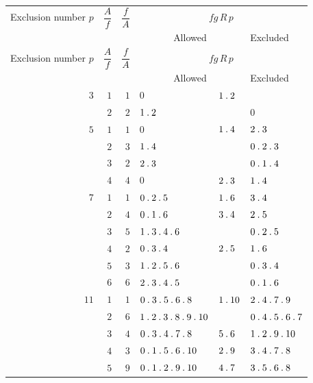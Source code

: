 \clearpage
\begingroup\fontsize{8.3}{9.2}\selectfont\setlength{\tabcolsep}{2pt}\renewcommand{\arraystretch}{1.00}
\begin{longtable}{r|r|r|p{113pt}|p{29pt}|p{120pt}}
\hline
\shortstack{Exclusion\\number\\$p$} & $\dfrac{A}{f}$ & $\dfrac{f}{A}$ & \multicolumn{3}{c}{$fg\,R\,p$}\\\cline{4-6}
& & & \multicolumn{2}{c|}{Allowed} & Excluded\\\hline
\endfirsthead
\shortstack{Exclusion\\number\\$p$} & $\dfrac{A}{f}$ & $\dfrac{f}{A}$ & \multicolumn{3}{c}{$fg\,R\,p$}\\\cline{4-6}
& & & \multicolumn{2}{c|}{Allowed} & Excluded\\\hline
\endhead
$3$ & $1$ & $1$ & $0$ & $1\mathbin{.} 2$ & \\
 & $2$ & $2$ & $1\mathbin{.} 2$ &  & $0$\\
$5$ & $1$ & $1$ & $0$ & $1\mathbin{.} 4$ & $2\mathbin{.} 3$\\
 & $2$ & $3$ & $1\mathbin{.} 4$ &  & $0\mathbin{.} 2\mathbin{.} 3$\\
 & $3$ & $2$ & $2\mathbin{.} 3$ &  & $0\mathbin{.} 1\mathbin{.} 4$\\
 & $4$ & $4$ & $0$ & $2\mathbin{.} 3$ & $1\mathbin{.} 4$\\
$7$ & $1$ & $1$ & $0\mathbin{.} 2\mathbin{.} 5$ & $1\mathbin{.} 6$ & $3\mathbin{.} 4$\\
 & $2$ & $4$ & $0\mathbin{.} 1\mathbin{.} 6$ & $3\mathbin{.} 4$ & $2\mathbin{.} 5$\\
 & $3$ & $5$ & $1\mathbin{.} 3\mathbin{.} 4\mathbin{.} 6$ &  & $0\mathbin{.} 2\mathbin{.} 5$\\
 & $4$ & $2$ & $0\mathbin{.} 3\mathbin{.} 4$ & $2\mathbin{.} 5$ & $1\mathbin{.} 6$\\
 & $5$ & $3$ & $1\mathbin{.} 2\mathbin{.} 5\mathbin{.} 6$ &  & $0\mathbin{.} 3\mathbin{.} 4$\\
 & $6$ & $6$ & $2\mathbin{.} 3\mathbin{.} 4\mathbin{.} 5$ &  & $0\mathbin{.} 1\mathbin{.} 6$\\
$11$ & $1$ & $1$ & $0\mathbin{.} 3\mathbin{.} 5\mathbin{.} 6\mathbin{.} 8$ & $1\mathbin{.} 10$ & $2\mathbin{.} 4\mathbin{.} 7\mathbin{.} 9$\\
 & $2$ & $6$ & $1\mathbin{.} 2\mathbin{.} 3\mathbin{.} 8\mathbin{.} 9\mathbin{.} 10$ &  & $0\mathbin{.} 4\mathbin{.} 5\mathbin{.} 6\mathbin{.} 7$\\
 & $3$ & $4$ & $0\mathbin{.} 3\mathbin{.} 4\mathbin{.} 7\mathbin{.} 8$ & $5\mathbin{.} 6$ & $1\mathbin{.} 2\mathbin{.} 9\mathbin{.} 10$\\
 & $4$ & $3$ & $0\mathbin{.} 1\mathbin{.} 5\mathbin{.} 6\mathbin{.} 10$ & $2\mathbin{.} 9$ & $3\mathbin{.} 4\mathbin{.} 7\mathbin{.} 8$\\
 & $5$ & $9$ & $0\mathbin{.} 1\mathbin{.} 2\mathbin{.} 9\mathbin{.} 10$ & $4\mathbin{.} 7$ & $3\mathbin{.} 5\mathbin{.} 6\mathbin{.} 8$\\

\end{longtable}
